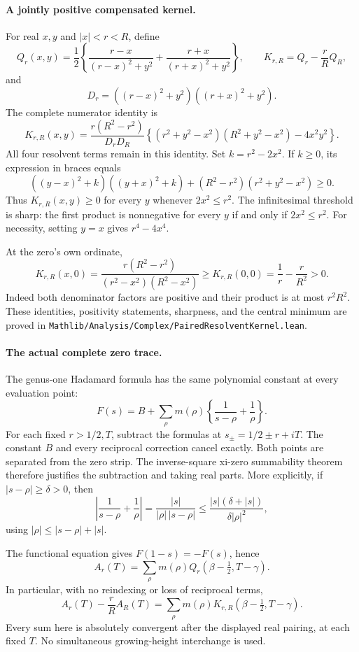 \paragraph{A jointly positive compensated kernel.}
For real \(x,y\) and \(|x|<r<R\), define
\[
 Q_r(x,y)=\frac12\left\{
 \frac{r-x}{(r-x)^2+y^2}+\frac{r+x}{(r+x)^2+y^2}\right\},
 \qquad K_{r,R}=Q_r-\frac rR Q_R,
\]
and
\[
 D_r=((r-x)^2+y^2)((r+x)^2+y^2).
\]
The complete numerator identity is
\begin{equation}\label{eq:paired-resolvent-numerator}
 K_{r,R}(x,y)=\frac{r(R^2-r^2)}{D_rD_R}
 \left\{(r^2+y^2-x^2)(R^2+y^2-x^2)-4x^2y^2\right\}.
\end{equation}
All four resolvent terms remain in this identity. Set \(k=r^2-2x^2\).
If \(k\ge0\), its expression in braces equals
\[
 ((y-x)^2+k)((y+x)^2+k)
 +(R^2-r^2)(r^2+y^2-x^2)\ge0.
\]
Thus \(K_{r,R}(x,y)\ge0\) for every \(y\) whenever
\(2x^2\le r^2\).
The infinitesimal threshold is sharp: the first product is nonnegative
for every \(y\) if and only if \(2x^2\le r^2\).
For necessity, setting \(y=x\) gives \(r^4-4x^4\).

At the zero's own ordinate,
\[
 K_{r,R}(x,0)=
 \frac{r(R^2-r^2)}{(r^2-x^2)(R^2-x^2)}
 \ge K_{r,R}(0,0)=\frac1r-\frac r{R^2}>0.
\]
Indeed both denominator factors are positive and their product is at
most \(r^2R^2\). These identities, positivity statements, sharpness,
and the central minimum are proved in
\texttt{Mathlib/Analysis/Complex/PairedResolventKernel.lean}.

\paragraph{The actual complete zero trace.}
The genus-one Hadamard formula has the same polynomial constant at
every evaluation point:
\[
 F(s)=B+\sum_\rho m(\rho)\left\{\frac1{s-\rho}+\frac1\rho\right\}.
\]
For each fixed \(r>1/2,T\), subtract the formulas at
\(s_\pm=1/2\pm r+iT\). The constant \(B\) and every reciprocal
correction cancel exactly. Both points are separated from the zero
strip. The inverse-square xi-zero summability theorem therefore
justifies the subtraction and taking real parts. More explicitly,
if \(|s-\rho|\ge\delta>0\), then
\[
 \left|\frac1{s-\rho}+\frac1\rho\right|
 =\frac{|s|}{|\rho|\,|s-\rho|}
 \le \frac{|s|(\delta+|s|)}{\delta|\rho|^2},
\]
using \(|\rho|\le|s-\rho|+|s|\).

The functional equation gives \(F(1-s)=-F(s)\), hence
\[
 A_r(T)=\sum_\rho m(\rho)
 Q_r\left(\beta-\tfrac12,T-\gamma\right).
\]
In particular, with no reindexing or loss of reciprocal terms,
\begin{equation}\label{eq:complete-compensated-xi-trace}
 A_r(T)-\frac rR A_R(T)=
 \sum_\rho m(\rho)
 K_{r,R}\left(\beta-\tfrac12,T-\gamma\right).
\end{equation}
Every sum here is absolutely convergent after the displayed real
pairing, at each fixed \(T\). No simultaneous growing-height
interchange is used.

